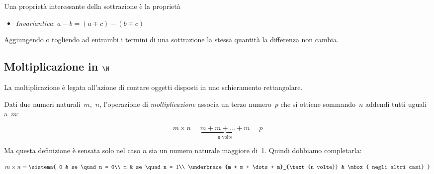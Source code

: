 Una proprietà interessante della sottrazione è la proprietà 
\begin{itemize} [noitemsep]
 \item \emph{Invariantiva}: \(a - b = (a \mp c) - (b \mp c)\)
\end{itemize}

\begin{definizione}{}{}
Aggiungendo o togliendo ad entrambi i 
termini di una sottrazione la stessa quantità la differenza non cambia.
\end{definizione}

\subsection{Moltiplicazione in $\N$}

La moltiplicazione è legata all'azione di contare oggetti disposti in uno
schieramento rettangolare.

\begin{definizione}{}{}
Dati due numeri naturali~\(m\),~\(n\), l'operazione di \emph{moltiplicazione} 
associa un terzo numero~\(p\) che si ottiene sommando~\(n\) addendi tutti 
uguali a~\(m\):

\begin{inaccessibleblock}[
\[m \times n = \mbox{n volte}{(m + m + \dots + m)} = p\]
]
\[m \times n = \underbrace{m + m + \dots + m}_{\text{n volte}} = p\]
\end{inaccessibleblock}
\end{definizione}

Ma questa definizione è sensata solo nel caso \(n\) sia un numero 
naturale maggiore di~1.
Quindi dobbiamo completarla:

\begin{inaccessibleblock}[
\begin{definizione}{}{}
\[
m \times n = \begin{cases}
 0 & se \quad n = 0\\
 m & se \quad n = 1\\
 \mbox{n volte}{(m + m + \dots + m)} & \mbox{ negli altri casi}
\end{cases}\]
\end{definizione}
]
\begin{definizione}{}{}
\[
m \times n = \sistema{
 0 & se \quad n = 0\\
 m & se \quad n = 1\\
 \underbrace{m + m + \dots + m}_{\text{n volte}} & \mbox{ negli altri casi}
}\]
\end{definizione}
\end{inaccessibleblock}

